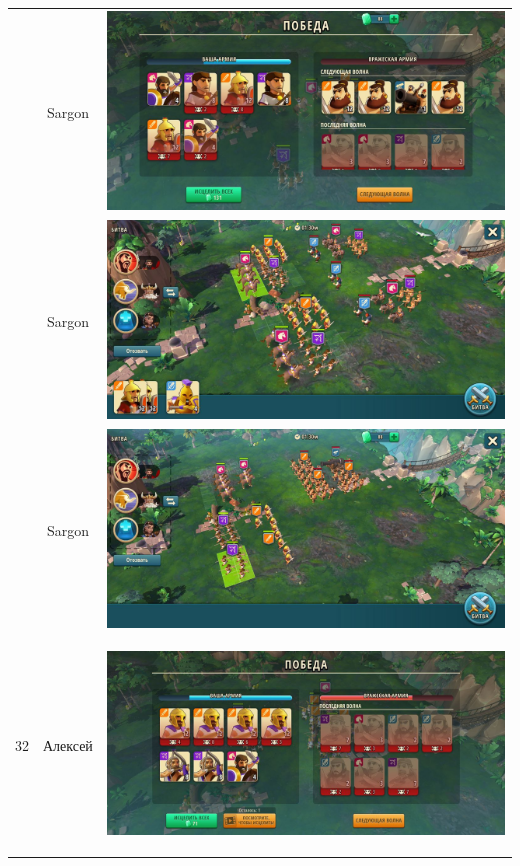 \begin{longtable}{|c|c|c|}
	& Sargon &
	\includegraphics[width=0.75\linewidth]{./parts/media/TreasureHunt/32/sargon/photo_2022-04-07_10-05-39.jpg} \\
	& Sargon &
	\includegraphics[width=0.75\linewidth]{./parts/media/TreasureHunt/32/sargon/photo_2022-04-07_10-05-31.jpg} \\
	& Sargon &
	\includegraphics[width=0.75\linewidth]{./parts/media/TreasureHunt/32/sargon/photo_2022-04-07_10-05-42.jpg} \\
	\hline
	\multirow{12}{*}{32} & Алексей &
	\hypertarget{fight32}{\includegraphics[width=0.75\linewidth]{./parts/media/TreasureHunt/32/alexey/photo_2022-04-14_13-54-49.jpg}} \\

\end{longtable}
